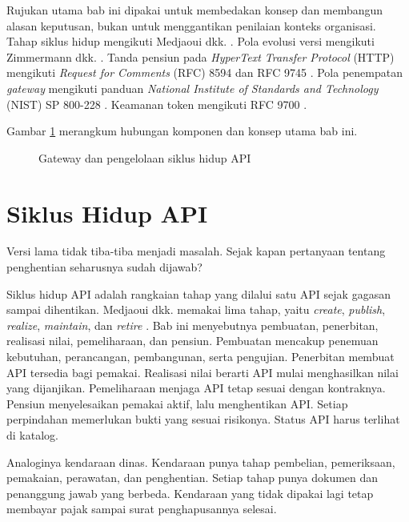 Rujukan utama bab ini dipakai untuk membedakan konsep dan membangun alasan keputusan, bukan untuk menggantikan penilaian
konteks organisasi. Tahap siklus hidup mengikuti Medjaoui dkk. \cite{medjaoui2021continuous}. Pola evolusi versi
mengikuti Zimmermann dkk. \cite{zimmermann2022patterns}. Tanda pensiun pada \textit{HyperText Transfer Protocol} (HTTP)
mengikuti \textit{Request for Comments} (RFC) 8594 \cite{c10-rfc8594} dan RFC 9745 \cite{c10-rfc9745}. Pola penempatan
\textit{gateway} mengikuti panduan \textit{National Institute of Standards and Technology} (NIST) SP 800-228
\cite{nist-sp800-228}. Keamanan token mengikuti RFC 9700 \cite{rfc9700}.

Gambar \ref{fig:ch10-ilustrasi-bab} merangkum hubungan komponen dan konsep utama bab ini.
\begin{figure}[!htb]
  \centering
  
  \caption{Gateway dan pengelolaan siklus hidup API}
  \label{fig:ch10-ilustrasi-bab}
\end{figure}

\section{Siklus Hidup API}

Versi lama tidak tiba-tiba menjadi masalah. Sejak kapan pertanyaan tentang penghentian seharusnya sudah dijawab?

Siklus hidup API adalah rangkaian tahap yang dilalui satu API sejak gagasan sampai dihentikan. Medjaoui dkk. memakai
lima tahap, yaitu \textit{create}, \textit{publish}, \textit{realize}, \textit{maintain}, dan \textit{retire}
\cite{medjaoui2021continuous}. Bab ini menyebutnya pembuatan, penerbitan, realisasi nilai, pemeliharaan, dan pensiun.
Pembuatan mencakup penemuan kebutuhan, perancangan, pembangunan, serta pengujian. Penerbitan membuat API tersedia bagi
pemakai. Realisasi nilai berarti API mulai menghasilkan nilai yang dijanjikan. Pemeliharaan menjaga API tetap sesuai
dengan kontraknya. Pensiun menyelesaikan pemakai aktif, lalu menghentikan API. Setiap perpindahan memerlukan bukti yang
sesuai risikonya. Status API harus terlihat di katalog.

Analoginya kendaraan dinas. Kendaraan punya tahap pembelian, pemeriksaan, pemakaian, perawatan, dan penghentian. Setiap
tahap punya dokumen dan penanggung jawab yang berbeda. Kendaraan yang tidak dipakai lagi tetap membayar pajak sampai
surat penghapusannya selesai.

